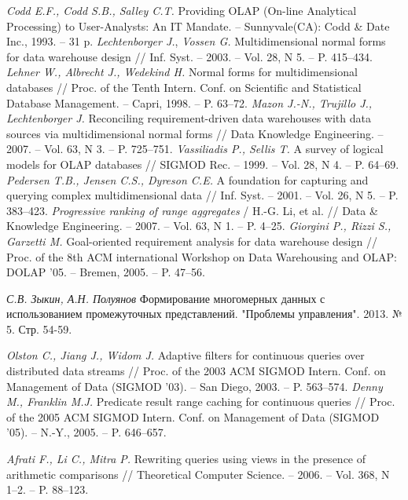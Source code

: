 \begin{thebibliography}{9}
  \textit{Codd E.F., Codd S.B., Salley C.T.}
  Providing OLAP (On-line Analytical Processing) to User-Analysts: An IT
  Mandate. – Sunnyvale(CA): Codd \& Date Inc.,
  1993.
  – 31 p.
  \textit{Lechtenborger J.}, \textit{Vossen G.}
  Multidimensional normal forms for data warehouse design
  // Inf. Syst.
  – 2003.
  – Vol. 28, N 5. – P. 415–434. 
  \textit{Lehner W., Albrecht J., Wedekind H.}
  Normal forms for multidimensional databases
  // Proc. of the Tenth Intern. Conf. on Scientific and Statistical Database
  Management.
  – Capri, 1998.
  – P. 63–72.
  \textit{Mazon J.-N., Trujillo J., Lechtenborger J.}
  Reconciling requirement-driven data warehouses with data sources via
  multidimensional normal forms
  // Data Knowledge Engineering.
  – 2007.
  – Vol. 63, N 3. – P. 725–751.
  \textit{Vassiliadis P., Sellis T.}
  A survey of logical models for OLAP databases
  // SIGMOD Rec.
  – 1999.
  – Vol. 28, N 4. – P. 64–69.
  \textit{Pedersen T.B., Jensen C.S., Dyreson C.E.}
  A foundation for capturing and querying complex multidimensional data
  // Inf. Syst.
  – 2001.
  – Vol. 26, N 5. – P. 383–423.
  \textit{Progressive ranking of range aggregates}
  / H.-G. Li, et al.
  // Data \& Knowledge Engineering.
  – 2007.
  – Vol. 63, N 1. – P. 4–25. 
  \textit{Giorgini P., Rizzi S., Garzetti M.}
  Goal-oriented requirement analysis for data warehouse design
  // Proc. of the 8th ACM international Workshop on Data Warehousing and OLAP: DOLAP '05.
  – Bremen, 2005.
  – P. 47–56.

  \textit{С.В. Зыкин, А.Н. Полуянов}
  Формирование многомерных данных с использованием промежуточных представлений.
  "Проблемы управления".
  2013.
  № 5. Стр. 54-59.

  \textit{Olston C., Jiang J., Widom J.}
  Adaptive filters for continuous queries over distributed data streams
  // Proc. of the 2003 ACM SIGMOD Intern. Conf. on Management of Data (SIGMOD '03).
  – San Diego, 2003.
  – P. 563–574.
  \textit{Denny M., Franklin M.J.}
  Predicate result range caching for continuous queries
  // Proc. of the 2005 ACM SIGMOD Intern. Conf. on Management of Data (SIGMOD '05).
  – N.-Y., 2005.
  – P. 646–657.

  \textit{Afrati F., Li C., Mitra P.}
  Rewriting queries using views in the presence of arithmetic comparisons
  // Theoretical Computer Science.
  – 2006.
 – Vol. 368, N 1–2. – P. 88–123.


\end{thebibliography}
